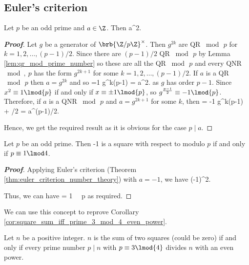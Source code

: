 \subsection{Euler's criterion}

\begin{theorem}\label{thm:euler_criterion_number_theory}
Let $p$ be an odd prime and $a\in \Z$. Then
\be
{} \equiv a^{2}.
\ee
\end{theorem}

\begin{proof}[\bf Proof]
Let $g$ be a generator of $\brb{\Z/p\Z}^\times$. Then $g^{2k}$ are QR $\bmod\, p$ for $k=1,2,\dots, (p-1)/2$. Since there are $(p-1)/2$ QR $\bmod\, p$ by Lemma \ref{lem:qr_mod_prime_number} so these are all the QR $\bmod\, p$ and every QNR $\bmod,\ p$ has the form $g^{2k+1}$ for some $k=1,2,\dots,(p-1)/2$. If $a$ is a QR $\bmod\, p$ then $a = g^{2k}$ and so
\be
{} =1 \equiv g^{k(p-1)} = a^{2}.
\ee
as $g$ has order $p-1$. Since $x^2 \equiv 1\lmod{p}$ if and only if $x\equiv \pm 1\lmod{p}$, so $g^{\frac {p-1}2} \equiv -1 \lmod{p}$. Therefore, if $a$ is a QNR $\bmod\, p$ and $a = g^{2k+1}$ for some $k$, then
\be
{} = -1 \equiv g^{k(p-1) + /2} = a^{(p-1)/2}.
\ee

Hence, we get the required result as it is obvious for the case $p\mid a$.
\end{proof}

\begin{corollary}\label{cor:minus_1_is_qr_iff_prime_1_mod_4}
Let $p$ be an odd prime. Then -1 is a square with respect to modulo $p$ if and only if $p\equiv 1\lmod 4$.
\end{corollary}

\begin{proof}[\bf Proof]
Applying Euler's criterion (Theorem \ref{thm:euler_criterion_number_theory}) with $a = -1$, we have
\be
{} \equiv (-1)^{2}.
\ee

Thus, we can have
\be
{} = 1 \ \lra\ p
\ee
as required.
\end{proof}


We can use this concept to reprove Corollary \ref{cor:square_sum_iff_prime_3_mod_4_even_power}.

\begin{theorem}
Let $n$ be a positive integer. $n$ is the sum of two squares (could be zero) if and only if every prime number $p\mid n$ with $p\equiv 3\lmod{4}$ divides $n$ with an even power.
\end{theorem}

